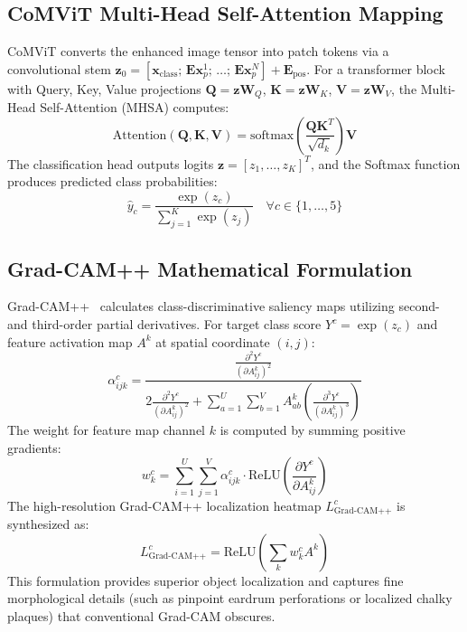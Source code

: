\documentclass[12pt,a4paper]{report}
\begin{document}
\subsection{CoMViT Multi-Head Self-Attention Mapping}
CoMViT converts the enhanced image tensor into patch tokens via a convolutional stem $\mathbf{z}_0 = [\mathbf{x}_{\text{class}}; \, \mathbf{E}\mathbf{x}_p^1; \, \dots; \, \mathbf{E}\mathbf{x}_p^N] + \mathbf{E}_{\text{pos}}$. For a transformer block with Query, Key, Value projections $\mathbf{Q} = \mathbf{z}\mathbf{W}_Q$, $\mathbf{K} = \mathbf{z}\mathbf{W}_K$, $\mathbf{V} = \mathbf{z}\mathbf{W}_V$, the Multi-Head Self-Attention (MHSA) computes:
\begin{equation}
    \mathrm{Attention}(\mathbf{Q}, \mathbf{K}, \mathbf{V}) = \mathrm{softmax}\left( \frac{\mathbf{Q}\mathbf{K}^T}{\sqrt{d_k}} \right) \mathbf{V}
\end{equation}
The classification head outputs logits $\mathbf{z} = [z_1, \dots, z_K]^T$, and the Softmax function produces predicted class probabilities:
\begin{equation}
    \hat{y}_c = \frac{\exp(z_c)}{\sum_{j=1}^K \exp(z_j)} \quad \forall c \in \{1, \dots, 5\}
\end{equation}

\subsection{Grad-CAM++ Mathematical Formulation}
Grad-CAM++~\cite{ref_chattopadhay2018_gradcampp} calculates class-discriminative saliency maps utilizing second- and third-order partial derivatives. For target class score $Y^c = \exp(z_c)$ and feature activation map $A^k$ at spatial coordinate $(i, j)$:
\begin{equation}
    \alpha_{ijk}^c = \frac{\frac{\partial^2 Y^c}{(\partial A_{ij}^k)^2}}{2\frac{\partial^2 Y^c}{(\partial A_{ij}^k)^2} + \sum_{a=1}^U \sum_{b=1}^V A_{ab}^k \left( \frac{\partial^3 Y^c}{(\partial A_{ij}^k)^3} \right)}
\end{equation}
The weight for feature map channel $k$ is computed by summing positive gradients:
\begin{equation}
    w_k^c = \sum_{i=1}^U \sum_{j=1}^V \alpha_{ijk}^c \cdot \mathrm{ReLU}\left( \frac{\partial Y^c}{\partial A_{ij}^k} \right)
\end{equation}
The high-resolution Grad-CAM++ localization heatmap $L_{\text{Grad-CAM++}}^c$ is synthesized as:
\begin{equation}
    L_{\text{Grad-CAM++}}^c = \mathrm{ReLU}\left( \sum_k w_k^c A^k \right)
\end{equation}
This formulation provides superior object localization and captures fine morphological details (such as pinpoint eardrum perforations or localized chalky plaques) that conventional Grad-CAM obscures.
\end{document}
